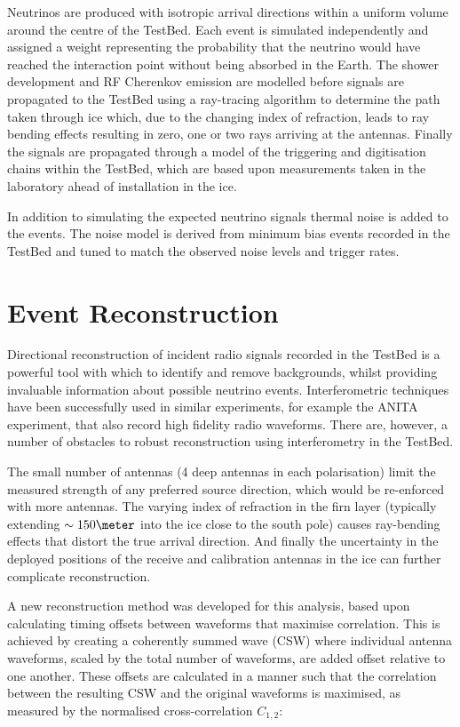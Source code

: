 Neutrinos are produced with isotropic arrival directions within a uniform volume around the centre of the TestBed. Each event is simulated independently and assigned a weight representing the probability that the neutrino would have reached the interaction point without being absorbed in the Earth. The shower development and RF Cherenkov emission are modelled before signals are propagated to the TestBed using a ray-tracing algorithm to determine the path taken through ice which, due to the changing index of refraction, leads to ray bending effects resulting in zero, one or two rays arriving at the antennas. Finally the signals are propagated through a model of the triggering and digitisation chains within the TestBed, which are based upon measurements taken in the laboratory ahead of installation in the ice.

In addition to simulating the expected neutrino signals thermal noise is added to the events. The noise model is derived from minimum bias events recorded in the TestBed and tuned to match the observed noise levels and trigger rates. 


\section{Event Reconstruction}
\label{sec:Analysis:Reconstruction}

Directional reconstruction of incident radio signals recorded in the TestBed is a powerful tool with which to identify and remove backgrounds, whilst providing invaluable information about possible neutrino events. Interferometric techniques have been successfully used in similar experiments, for example the ANITA experiment, that also record high fidelity radio waveforms. There are, however, a number of obstacles to robust reconstruction using interferometry in the TestBed. 

The small number of antennas (4 deep antennas in each polarisation) limit the measured strength of any preferred source direction, which would be re-enforced with more antennas. The varying index of refraction in the firn layer (typically extending $\sim 150 \meter$ into the ice close to the south pole) causes ray-bending effects that distort the true arrival direction. And finally the uncertainty in the deployed positions of the receive and calibration antennas in the ice can further complicate reconstruction. 


A new reconstruction method was developed for this analysis, based upon calculating timing offsets between waveforms that maximise correlation. This is achieved by creating a coherently summed wave (CSW) where individual antenna waveforms, scaled by the total number of waveforms, are added offset relative to one another. These offsets are calculated in a manner such that the correlation between the resulting CSW and the original waveforms is maximised, as measured by the normalised cross-correlation $C_{1,2}$:


